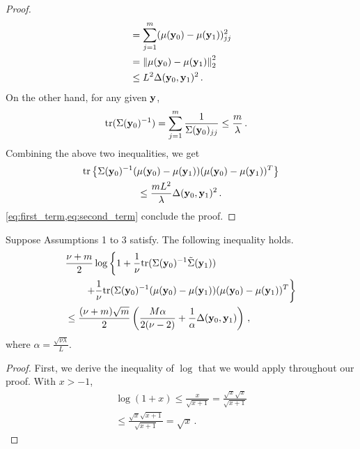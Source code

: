 {\begin{proof}
\begin{align*}
&= \sum_{j=1}^{m} (\mu(\mathbf{y}_0) - \mu(\mathbf{y}_1))^2_{jj} \\
&= \left \| \mu(\mathbf{y}_0) - \mu(\mathbf{y}_1) \right \|^2_2 \\  
&\le L^2 \Delta(\mathbf{y}_0, \mathbf{y}_1)^2 \,.
\end{align*} 
On the other hand, for any given $\mathbf{y}$, 
\begin{align}
\mathrm{tr}(\Sigma(\mathbf{y}_0)^{-1}) 
&= \sum_{j=1}^{m} \frac{1}{\Sigma(\mathbf{y}_0)_{jj}} \le \frac{m}{\lambda} \,.
\end{align} 
Combining the above two inequalities, we get 
\begin{multline}
\mathrm{tr} \left\{ \Sigma(\mathbf{y}_0)^{-1} (\mu(\mathbf{y}_0) - \mu(\mathbf{y}_1)) (\mu(\mathbf{y}_0) - \mu(\mathbf{y}_1))^T  \right\} \\
\le \frac{m L^2}{\lambda} \Delta(\mathbf{y}_0, \mathbf{y}_1)^2 \label{eq:second_term}\,.
\end{multline}
\cref{eq:first_term,eq:second_term} conclude the proof.
\end{proof}

\begin{corollary}
\label{prop:trace}
Suppose Assumptions 1 to 3  satisfy. 
The following inequality holds.
\begin{align}
&\frac {\nu + m} 2 \log \left\{ 1 + \frac{1}{\nu} \mathrm{tr}(\Sigma(\mathbf{y}_0)^{-1} \tilde{\Sigma}(\mathbf{y}_1))  \right. \notag \\
&\qquad \left. + \frac{1}{\nu} \mathrm{tr}(\Sigma(\mathbf{y}_0)^{-1} (\mu(\mathbf{y}_0) - \mu(\mathbf{y}_1))(\mu(\mathbf{y}_0) - \mu(\mathbf{y}_1))^T \right\} \notag \\
&\le \frac{(\nu + m) \sqrt{m}}{2} \left( \frac{M \alpha}{2(\nu-2)} + \frac{1}{\alpha} \Delta(\mathbf{y}_0, \mathbf{y}_1) \right)\,,
\end{align}
where $\alpha = \frac{\sqrt{\nu \lambda}}{L}$.
\end{corollary}
\begin{proof}
First, we derive the inequality of $\log$ that we would apply throughout our proof. 
With $x > -1$, 
\begin{multline}
\log (1+x) 
\le \frac{x}{\sqrt{x+1}}  
= \frac{\sqrt{x} \sqrt{x}}{\sqrt{x+1}} \\
\le \frac{\sqrt{x} \sqrt{x+1}}{\sqrt{x+1}} 
= \sqrt{x} \,.
\end{multline}


\end{proof}}
